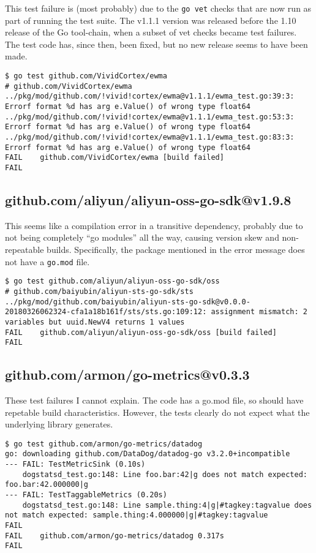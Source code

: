 \documentclass[a4paper]{paper}
\begin{document}
This test failure is (most probably) due to the {\tt go vet} checks
that are now run as part of running the test suite. The v1.1.1 version
was released before the 1.10 release of the Go tool-chain, when a
subset of vet checks became test failures. The test code has, since
then, been fixed, but no new release seems to have been made.

\begin{verbatim}
$ go test github.com/VividCortex/ewma
# github.com/VividCortex/ewma
../pkg/mod/github.com/!vivid!cortex/ewma@v1.1.1/ewma_test.go:39:3: Errorf format %d has arg e.Value() of wrong type float64
../pkg/mod/github.com/!vivid!cortex/ewma@v1.1.1/ewma_test.go:53:3: Errorf format %d has arg e.Value() of wrong type float64
../pkg/mod/github.com/!vivid!cortex/ewma@v1.1.1/ewma_test.go:83:3: Errorf format %d has arg e.Value() of wrong type float64
FAIL	github.com/VividCortex/ewma [build failed]
FAIL
\end{verbatim}

\subsection{github.com/aliyun/aliyun-oss-go-sdk@v1.9.8}

This seems like a compilation error in a transitive dependency,
probably due to not being completely ``go modules'' all the way,
causing version skew and non-repeatable builds. Specifically, the
package mentioned in the error message does not have a {\tt go.mod}
file.

\begin{verbatim}
$ go test github.com/aliyun/aliyun-oss-go-sdk/oss
# github.com/baiyubin/aliyun-sts-go-sdk/sts
../pkg/mod/github.com/baiyubin/aliyun-sts-go-sdk@v0.0.0-20180326062324-cfa1a18b161f/sts/sts.go:109:12: assignment mismatch: 2 variables but uuid.NewV4 returns 1 values
FAIL	github.com/aliyun/aliyun-oss-go-sdk/oss [build failed]
FAIL
\end{verbatim}

\subsection{github.com/armon/go-metrics@v0.3.3}

These test failures I cannot explain. The code has a go.mod file, so
should have repetable build characteristics. However, the tests
clearly do not expect what the underlying library generates.

\begin{verbatim}
$ go test github.com/armon/go-metrics/datadog
go: downloading github.com/DataDog/datadog-go v3.2.0+incompatible
--- FAIL: TestMetricSink (0.10s)
    dogstatsd_test.go:148: Line foo.bar:42|g does not match expected: foo.bar:42.000000|g
--- FAIL: TestTaggableMetrics (0.20s)
    dogstatsd_test.go:148: Line sample.thing:4|g|#tagkey:tagvalue does not match expected: sample.thing:4.000000|g|#tagkey:tagvalue
FAIL
FAIL	github.com/armon/go-metrics/datadog	0.317s
FAIL
\end{verbatim}
\end{document}
